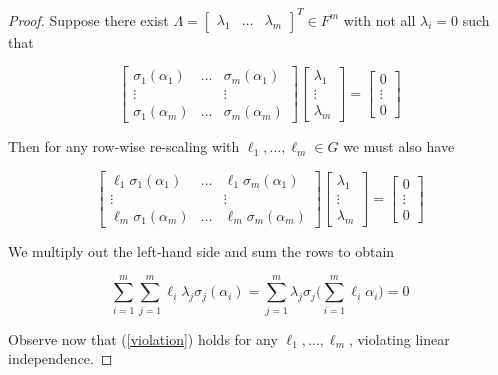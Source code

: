 \begin{proof}
Suppose there exist $\Lambda = \begin{bmatrix} \lambda_1 &  \ldots & \lambda_m \end{bmatrix}^T \in F^m$ with not all $\lambda_i = 0$ such that

\begin{equation*}
 \begin{bmatrix}
\sigma_1(\alpha_1) & \ldots & \sigma_m(\alpha_1) \\ \vdots & & \vdots \\ \sigma_1(\alpha_m) & \ldots & \sigma_m(\alpha_m) \end{bmatrix} \begin{bmatrix} \lambda_1 \\ \vdots \\ \lambda_m \end{bmatrix} = \begin{bmatrix}
0 \\ \vdots \\ 0
\end{bmatrix}
\end{equation*}

Then for any row-wise re-scaling with $\ell_1, \ldots, \ell_m \in G$ we must also have

\begin{equation*}
 \begin{bmatrix}
\ell_1\sigma_1(\alpha_1) & \ldots & \ell_1\sigma_m(\alpha_1) \\ \vdots & & \vdots \\ \ell_m\sigma_1(\alpha_m) & \ldots & \ell_m\sigma_m(\alpha_m) \end{bmatrix} \begin{bmatrix} \lambda_1 \\ \vdots \\ \lambda_m \end{bmatrix} = \begin{bmatrix}
0 \\ \vdots \\ 0
\end{bmatrix}
\end{equation*}

We multiply out the left-hand side and sum the rows to obtain

\begin{equation}\label{violation}
    \sum_{i=1}^m\sum_{j=1}^m\ell_i\lambda_j\sigma_j(\alpha_i) = \sum_{j=1}^m\lambda_j\sigma_j\bigg(\sum_{i=1}^m\ell_i\alpha_i\bigg)  = 0
\end{equation}

Observe now that (\ref{violation}) holds for any $\ell_1, \ldots, \ell_m $, violating linear independence.

\end{proof}

